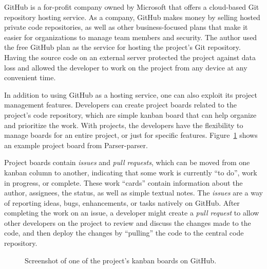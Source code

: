 \documentclass[english,engineering]{wizthesis}
\newcommand{\thisproject}{Parser-parser}
\begin{document}
GitHub \cite{github} is a for-profit company owned by Microsoft that offers a cloud-based Git
repository hosting service. As a company, GitHub makes money by selling hosted
private code repositories, as well as other business-focused plans that make it
easier for organizations to manage team members and security. The author used
the free GitHub plan as the service for hosting the project's Git repository.
Having the source code on an external server protected the project against data
loss and allowed the developer to work on the project from any device at any
convenient time.

In addition to using GitHub as a hosting service, one can also exploit its
project management features. Developers can create project boards related to the
project's code repository, which are simple kanban board that can help organize
and prioritize the work. With projects, the developers have the flexibility to
manage boards for an entire project, or just for specific features.
Figure~\ref{fig:github-projects} shows an example project board from
\thisproject{}.

Project boards contain \emph{issues} and \emph{pull requests}, which can be
moved from one kanban column to another, indicating that some work is currently
``to do'', work in progress, or complete. These work ``cards'' contain
information about the author, assignees, the status, as well as simple textual
notes. The \emph{issues} are a way of reporting ideas, bugs, enhancements, or
tasks natively on GitHub. After completing the work on an issue, a developer
might create a \emph{pull request} to allow other developers on the project to
review and discuss the changes made to the code, and then deploy the changes by
``pulling'' the code to the central code repository.

\begin{figure}[h]
  \centering
  \caption{Screenshot of one of the project's kanban boards on GitHub.}
  \label{fig:github-projects}
\end{figure}
\end{document}
